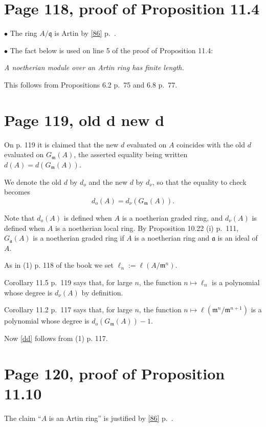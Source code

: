 \documentclass[12pt]{article}
\newcommand{\mf}{\mathfrak}
\newcommand{\bu}{\bullet}
\begin{document}
\section{Page 118, proof of Proposition 11.4}%

$\bu$ The ring $A/\mf q$ is Artin by \eqref{86} p.~\pageref{86}.

$\bu$ The fact below is used on line 5 of the proof of Proposition 11.4:

\emph{A noetherian module over an Artin ring has finite length.}

This follows from Propositions 6.2 p.~75 and 6.8 p.~77.

\section{Page 119, old d new d}\label{odnd}%

On p. 119 it is claimed that the new $d$ evaluated on $A$ coincides with the old $d$ evaluated on $G_{\mf m}(A)$, the asserted equality being written $d(A)=d(G_{\mf m}(A))$. 

We denote the old $d$ by $d_o$ and the new $d$ by $d_\nu$, so that the equality to check becomes 
\begin{equation}\label{dd}
d_o(A)=d_\nu(G_{\mf m}(A)).
\end{equation}

Note that $d_o(A)$ is defined when $A$ is a noetherian graded ring, and $d_\nu(A)$ is defined when $A$ is a noetherian local ring. By Proposition 10.22 (i) p.~111, $G_{\mf a}(A)$ is a noetherian graded ring if $A$ is a noetherian ring and $\mf a$ is an ideal of $A$.

As in (1) p. 118 of the book we set $\ell_n:=\ell(A/\mf m^n)$. 

Corollary 11.5 p.~119 says that, for large $n$, the function $n\mapsto\ell_n$ is a polynomial whose degree is $d_\nu(A)$ by definition. 

Corollary 11.2 p.~117 says that, for large $n$, the function $n\mapsto\ell(\mf m^n/\mf m^{n+1})$ is a polynomial whose degree is $d_o(G_{\mf m}(A))-1$.

Now \eqref{dd} follows from (1) p. 117.

\section{Page 120, proof of Proposition 11.10}%

The claim ``$A$ is an Artin ring'' is justified by \eqref{86} p.~\pageref{86}.
\end{document}
